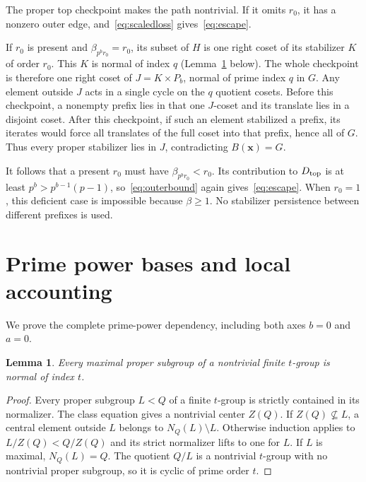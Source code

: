 \documentclass[11pt,letterpaper]{article}
\newtheorem{lemma}[theorem]{Lemma}
\theoremstyle{definition}\newtheorem{definition}{Definition}
\begin{document}
The proper top checkpoint makes the path nontrivial. If it omits $r_0$, it has a nonzero outer edge, and~\eqref{eq:scaledloss} gives~\eqref{eq:escape}.

If $r_0$ is present and $\beta_{p^br_0}=r_0$, its subset of $H$ is one right coset of its stabilizer $K$ of order $r_0$. This $K$ is normal of index $q$ (Lemma~\ref{lem:normal} below). The whole checkpoint is therefore one right coset of $J=K\times P_b$, normal of prime index $q$ in $G$. Any element outside $J$ acts in a single cycle on the $q$ quotient cosets. Before this checkpoint, a nonempty prefix lies in that one $J$-coset and its translate lies in a disjoint coset. After this checkpoint, if such an element stabilized a prefix, its iterates would force all translates of the full coset into that prefix, hence all of $G$. Thus every proper stabilizer lies in $J$, contradicting $B(\mathbf{x})=G$.

It follows that a present $r_0$ must have $\beta_{p^br_0}<r_0$. Its contribution to $D_{\rm top}$ is at least $p^b>p^{b-1}(p-1)$, so~\eqref{eq:outerbound} again gives~\eqref{eq:escape}. When $r_0=1$, this deficient case is impossible because $\beta\ge1$. No stabilizer persistence between different prefixes is used.

\section{Prime power bases and local accounting}\label{sec:bases}
We prove the complete prime-power dependency, including both axes $b=0$ and $a=0$.

\begin{lemma}\label{lem:normal}
Every maximal proper subgroup of a nontrivial finite $t$-group is normal of index $t$.
\end{lemma}
\begin{proof}
Every proper subgroup $L<Q$ of a finite $t$-group is strictly contained in its normalizer. The class equation gives a nontrivial center $Z(Q)$. If $Z(Q)\not\subseteq L$, a central element outside $L$ belongs to $N_Q(L)\setminus L$. Otherwise induction applies to $L/Z(Q)<Q/Z(Q)$ and its strict normalizer lifts to one for $L$. If $L$ is maximal, $N_Q(L)=Q$. The quotient $Q/L$ is a nontrivial $t$-group with no nontrivial proper subgroup, so it is cyclic of prime order $t$.
\end{proof}
\end{document}
